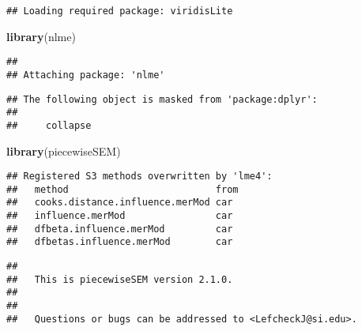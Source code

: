\documentclass[]{article}
\newenvironment{Shaded}{\begin{snugshade}}{\end{snugshade}}
\newcommand{\CommentTok}[1]{\textcolor[rgb]{0.56,0.35,0.01}{\textit{#1}}}
\newcommand{\DataTypeTok}[1]{\textcolor[rgb]{0.13,0.29,0.53}{#1}}
\newcommand{\DecValTok}[1]{\textcolor[rgb]{0.00,0.00,0.81}{#1}}
\newcommand{\KeywordTok}[1]{\textcolor[rgb]{0.13,0.29,0.53}{\textbf{#1}}}
\newcommand{\NormalTok}[1]{#1}
\newcommand{\OperatorTok}[1]{\textcolor[rgb]{0.81,0.36,0.00}{\textbf{#1}}}
\newcommand{\StringTok}[1]{\textcolor[rgb]{0.31,0.60,0.02}{#1}}
\begin{document}
\begin{verbatim}
## Loading required package: viridisLite
\end{verbatim}

\begin{Shaded}
\begin{Highlighting}[]
\KeywordTok{library}\NormalTok{(nlme)}
\end{Highlighting}
\end{Shaded}

\begin{verbatim}
## 
## Attaching package: 'nlme'
\end{verbatim}

\begin{verbatim}
## The following object is masked from 'package:dplyr':
## 
##     collapse
\end{verbatim}

\begin{Shaded}
\begin{Highlighting}[]
\KeywordTok{library}\NormalTok{(piecewiseSEM)}
\end{Highlighting}
\end{Shaded}

\begin{verbatim}
## Registered S3 methods overwritten by 'lme4':
##   method                          from
##   cooks.distance.influence.merMod car 
##   influence.merMod                car 
##   dfbeta.influence.merMod         car 
##   dfbetas.influence.merMod        car
\end{verbatim}

\begin{verbatim}
## 
##   This is piecewiseSEM version 2.1.0.
## 
## 
##   Questions or bugs can be addressed to <LefcheckJ@si.edu>.
\end{verbatim}

\begin{Shaded}
\end{Shaded}
\end{document}

